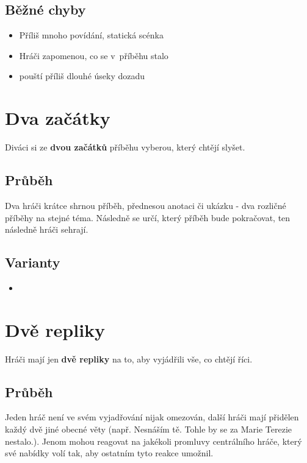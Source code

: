 \subsection{ Běžné chyby } \begin{itemize}
\item  Příliš mnoho povídání, statická scénka
\item  Hráči zapomenou, co se v~příběhu stalo
\item  {} pouští příliš dlouhé úseky dozadu
\end{itemize}
 
 
 
 
 
\needspace{5cm} \section{Dva začátky} \label{dva začátky}  
 
 
Diváci si ze \textbf{dvou začátků} příběhu vyberou, který chtějí slyšet. 
 
 
\subsection{Průběh} Dva hráči krátce shrnou příběh, přednesou anotaci či ukázku - dva rozličné příběhy na stejné téma. 
Následně se  určí, který příběh bude pokračovat, ten následně hráči sehrají. 
 
\subsection{ Varianty } \begin{itemize}
\item  {}
\end{itemize}
 
 
 
\needspace{5cm} \section{Dvě repliky} \label{dvě repliky}  
 
Hráči mají jen \textbf{dvě repliky} na to, aby vyjádřili vše, co chtějí říci. 
 
\subsection{Průběh} Jeden hráč není ve svém vyjadřování nijak omezován, další hráči mají přidělen každý dvě jiné obecné věty (např. Nesnáším tě.  Tohle by se za Marie Terezie nestalo.). Jenom  mohou reagovat na jakékoli promluvy centrálního hráče, který své nabídky volí tak, aby ostatním tyto reakce umožnil. 
 
